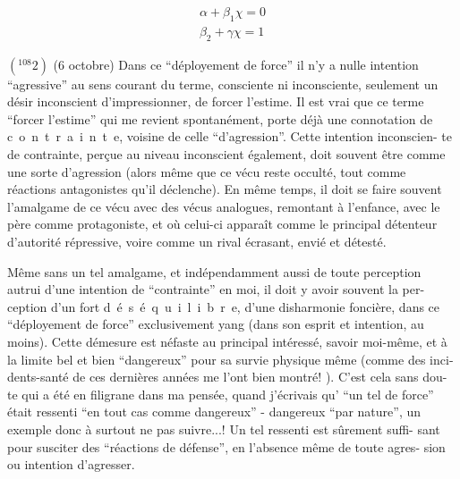 \[
\boxed{\begin{gathered}
\alpha+\beta_1\chi=0\\
\beta_2+\gamma\chi=1
\end{gathered}}
\]

\(({}^{108}2)\) (6 octobre) Dans ce ``déployement de force'' il n'y a nulle intention
``agressive'' au sens courant du terme, consciente ni inconsciente, seulement un
désir inconscient d'impressionner, de forcer l'estime. Il est vrai que ce terme
``forcer l'estime'' qui me revient spontanément, porte déjà une connotation de
\mbox{c o n t r a i n t e}, voisine de celle ``d'agression''. Cette intention inconscien-\linebreak
te de contrainte, perçue au niveau inconscient également, doit souvent être 
comme une sorte d'agression (alors même que ce vécu reste occulté, tout comme 
réactions antagonistes qu'il déclenche). En même temps, il doit se faire souvent
l'amalgame de ce vécu avec des vécus analogues, remontant à l'enfance, avec le
père comme protagoniste, et où celui-ci apparaît comme le principal détenteur
d'autorité répressive, voire comme un rival écrasant, envié et détesté.

Même sans un tel amalgame, et indépendamment aussi de toute perception 
autrui d'une intention de ``contrainte'' en moi, il doit y avoir souvent la per-\linebreak
ception d'un fort \mbox{d é s é q u i l i b r e}, d'une disharmonie foncière, dans
ce ``déployement de force'' exclusivement yang (dans son esprit et intention, au
moins). Cette démesure est néfaste au principal intéressé, savoir moi-même, et
à la limite bel et bien ``dangereux'' pour sa survie physique même (comme des inci-\linebreak
dents-santé de ces dernières années me l'ont bien montré! ). C'est cela sans dou-\linebreak
te qui a été en filigrane dans ma pensée, quand j'écrivais qu' ``un tel 
de force'' était ressenti ``en tout cas comme dangereux'' - dangereux ``par nature'',
un exemple donc à surtout ne pas suivre...! Un tel ressenti est sûrement suffi-\linebreak
sant pour susciter des ``réactions de défense'', en l'absence même de toute agres-\linebreak
sion ou intention d'agresser.

